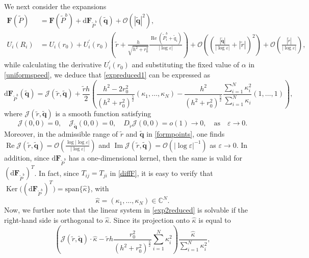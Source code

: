 \documentclass[11pt,reqno,a4paper]{amsart}
\numberwithin{equation}{section}
\def\dd{{\mathrm{d}}}
\newcommand{\C}{\mathbb{C}}
\newcommand{\ve}{\varepsilon}
\begin{document}
We next consider the  expansions
\begin{align*}
\mathbf{F}(\widetilde{P})&=\mathbf{F}(\widetilde{P}^{b})+\dd\mathbf{F}_{\widetilde{P}^b}(\tilde{\mathbf{q}})+\mathcal{O}(|\tilde{\mathbf{q}}|^2),\\
U_i(R_i)&=U_i(r_0)+U^{'}_{i}(r_0)\left(\tilde{r}+\frac{h}{\sqrt{h^2+r_0^2}}\frac{\operatorname{Re}\left(\widetilde{P}_i^{b}+\tilde{q}_i\right)}{|\log\ve|}\right)+\mathcal{O}\left(\left(\frac{|\tilde{\mathbf{q}}|}{|\log\ve|}+|\tilde{r}|\right)^{2}\right)+\mathcal{O}\left(\frac{|\tilde{r}|}{|\log\ve|}\right),
\end{align*}
while calculating the derivative $U_i^{'}(r_0)$ and substituting the fixed value of $\alpha$ in \eqref{uniformspeed}, we deduce that \eqref{expreduced1} can be expressed as
\begin{equation}\label{exp2reduced}
\dd\mathbf{F}_{\widetilde{P}^{b}}(\tilde{\mathbf{q}})=\mathcal{J}\left(\tilde{r},\tilde{\mathbf{q}}\right)+\frac{\tilde{r}h}{2}\left(\frac{h^2-2r_0^2}{(h^2+r_0^2)^{\frac 5 2}}(\kappa_1,\dots,\kappa_N) -\frac{h^2}{\left(h^2+r_0^2\right)^{\frac 5 2}}\frac{\sum\limits_{i=1}^{N} \kappa_i^2}{\sum\limits_{i=1}^{N}\kappa_i}(1,\dots,1)\right),
\end{equation}
where $\mathcal{J}(\tilde{r},\tilde{\mathbf{q}})$ is a smooth function satisfying
\begin{equation}\label{propK}
    \mathcal{J}(0,0)=0, \quad \mathcal{J}_{\tilde{\mathbf{q}}}(0,0)=0, \quad D_{\tilde{r}}\mathcal{J}(0,0)=o(1)\to 0, \quad \mbox{as}\quad \ve\to 0.
\end{equation}
Moreover, in the admissible range of $\tilde{r}$ and $\tilde{\mathbf{q}}$ in \eqref{formpoints}, one finds $\operatorname{Re}\mathcal{J}(\tilde{r},\tilde{\mathbf{q}})=\mathcal{O}\left(\frac{\log|\log\ve|}{|\log\ve|}\right)$ and $\operatorname{Im}\mathcal{J}(\tilde{r},\tilde{\mathbf{q}})=\mathcal{O}\left(|\log\ve|^{-1}\right)$ as $\ve \to 0$. In addition, since $\dd\mathbf{F}_{\widetilde{P}^{b}}$ has a one-dimensional kernel, then the same is valid for $\left(\dd\mathbf{F}_{\widetilde{P}^{b}}\right)^{T}$. In fact, since $T_{ij}=T_{ji}$ in \eqref{diffF}, it is easy to verify that $\operatorname{Ker}\big((\dd \mathbf{F}_{\widetilde{P}^{b}})^{T}\big)=\mbox{span}\{\hat{\kappa}\}$, with \[\hat \kappa=(\kappa_1,\dots,\kappa_N)\in\C^N.\]
Now, we further note that the linear system in \eqref{exp2reduced} is solvable if the right-hand side is orthogonal to $\hat\kappa.$ Since its projection onto $\hat\kappa$ is equal to 
\[\left(\mathcal{J}(\tilde{r},\tilde{\mathbf{q}})\cdot\hat\kappa-
\tilde{r}h\frac{r_0^2}{(h^2+r_0^2)^{\frac 5 2}}\sum_{i=1}^{N}\kappa_i^2\right)\frac{\hat\kappa}{\sum\limits_{i=1}^{N}\kappa_i^2},\]
\end{document}
